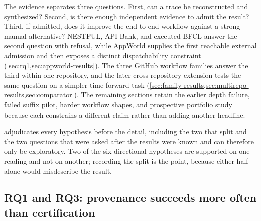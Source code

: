 The evidence separates three questions. First, can a trace be reconstructed and
synthesized? Second, is there enough independent evidence to admit the result? Third, if
admitted, does it improve the end-to-end workflow against a strong manual alternative?
NESTFUL, API-Bank, and executed BFCL answer the second question with refusal, while
AppWorld supplies the first reachable external admission and then exposes a distinct
dispatchability constraint (\cref{sec:rq1,sec:appworld-results}). The three
GitHub workflow families answer the third within one repository, and the later
cross-repository extension tests the same question on a simpler time-forward task
(\cref{sec:family-results,sec:multirepo-results,sec:comparator}). The remaining sections
retain the earlier depth failure, failed suffix pilot, harder workflow shapes, and
prospective portfolio study because each constrains a different claim rather than adding
another headline.

 adjudicates every hypothesis before the detail, including the two
that split and the two questions that were asked after the results were known and can
therefore only be exploratory.  Two of the six directional hypotheses are supported on one
reading and not on another; recording the split is the point, because either half alone
would misdescribe the result.

\begin{table}[t]
  \centering
  \caption{Every hypothesis and its outcome.  ``Pre-specified'' means fixed internally
  before the sealed test was scored; no part of this study was externally preregistered.
  The exploratory comparator and determinism question were formulated after the results they examine were
  known, so they carry no hypothesis and license no confirmatory claim.}
  \label{tab:hypotheses}
  \small
  
\end{table}

\subsection{RQ1 and RQ3: provenance succeeds more often than certification}
\label{sec:rq1}

